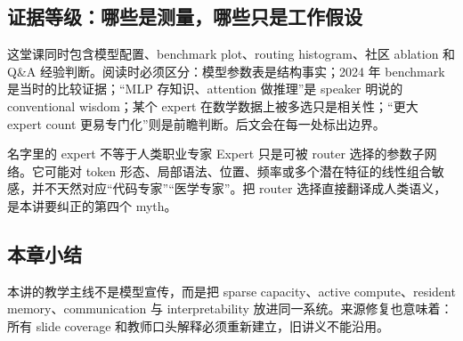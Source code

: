 
\subsection{证据等级：哪些是测量，哪些只是工作假设}

这堂课同时包含模型配置、benchmark plot、routing histogram、社区 ablation 和 Q\&A 经验判断。阅读时必须区分：模型参数表是结构事实；2024 年 benchmark 是当时的比较证据；“MLP 存知识、attention 做推理”是 speaker 明说的 conventional wisdom；某个 expert 在数学数据上被多选只是相关性；“更大 expert count 更易专门化”则是前瞻判断。后文会在每一处标出边界。

\begin{warningbox}{名字里的 expert 不等于人类职业专家}
Expert 只是可被 router 选择的参数子网络。它可能对 token 形态、局部语法、位置、频率或多个潜在特征的线性组合敏感，并不天然对应“代码专家”“医学专家”。把 router 选择直接翻译成人类语义，是本讲要纠正的第四个 myth。
\end{warningbox}

\subsection{本章小结}

本讲的教学主线不是模型宣传，而是把 sparse capacity、active compute、resident memory、communication 与 interpretability 放进同一系统。来源修复也意味着：所有 slide coverage 和教师口头解释必须重新建立，旧讲义不能沿用。

